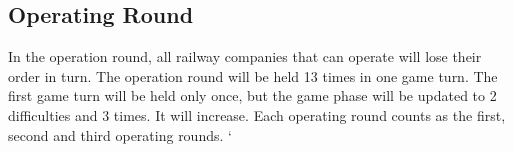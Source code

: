 \documentclass{article}
\begin{document}
\begin{CJK}{UTF8}{min}








\section{Operating Round}
In the operation round, all railway companies that can operate will
lose their order in turn. The operation round will be held 13 times in
one game turn. The first game turn will be held only once, but the
game phase will be updated to 2 difficulties and 3 times. It will
increase. Each operating round counts as the first, second and third
operating rounds. `


\end{CJK}
\end{document}
